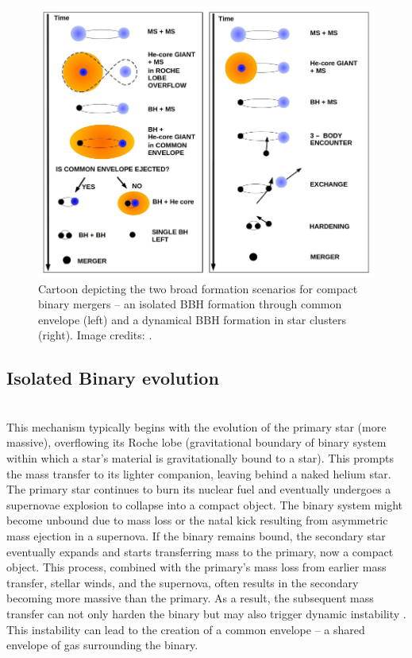 \begin{figure}
    \centering
    \includegraphics[width=\textwidth]{figures/Introduction/Two-broad-channels-cartoon.png}
    \caption{Cartoon depicting the two broad formation scenarios for compact binary mergers -- an isolated BBH formation through common envelope (left) and a dynamical BBH formation in star clusters (right). Image credits: \cite{Mapelli:2020vfa}.}
    \label{fig:two-broad-channels-cartoon}
\end{figure}


\subsection{Isolated Binary evolution}

\\

This mechanism typically begins with the evolution of the primary star (more massive), overflowing its Roche lobe (gravitational boundary of binary system within which a star's material is gravitationally bound to a star). This prompts the mass transfer to its lighter companion, leaving behind a naked helium star. The primary star continues to burn its nuclear fuel and eventually undergoes a supernovae explosion to collapse into a compact object.  The binary system might become unbound due to mass loss or the natal kick resulting from asymmetric mass ejection in a supernova. If the binary remains bound, the secondary star eventually expands and starts transferring mass to the primary, now a compact object. This process, combined with the primary's mass loss from earlier mass transfer, stellar winds, and the supernova, often results in the secondary becoming more massive than the primary. As a result, the subsequent mass transfer can not only harden the binary but may also trigger dynamic instability \cite{vandenHeuvel:2017pwp}. This instability can lead to the creation of a common envelope \cite{Paczynski:1993gz} -- a shared envelope of gas surrounding the binary. 

